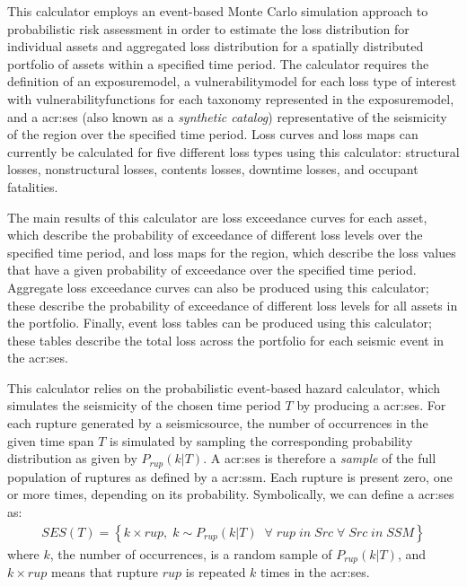 This calculator employs an event-based Monte Carlo simulation approach to
probabilistic risk assessment in order to estimate the loss distribution for
individual \glspl{asset} and aggregated loss distribution for a spatially
distributed portfolio of \glspl{asset} within a specified time period. The
calculator requires the definition of an \gls{exposuremodel}, a
\gls{vulnerabilitymodel} for each loss type of interest with
\glspl{vulnerabilityfunction} for each taxonomy represented in the
\gls{exposuremodel}, and a \glsdesc{acr:ses} (also known as a
\textit{synthetic catalog}) representative of the seismicity of the region
over the specified time period. Loss curves and loss maps can currently be
calculated for five different loss types using this calculator: structural
losses, nonstructural losses, contents losses, downtime losses, and occupant
fatalities.

The main results of this calculator are loss
exceedance curves for each \gls{asset}, which describe the probability of
exceedance of different loss levels over the specified time period, and loss
maps for the region, which describe the loss values that have a given
probability of exceedance over the specified time period. Aggregate loss
exceedance curves can also be produced using this calculator; these
describe the probability of exceedance of different loss levels for all
\glspl{asset} in the portfolio. Finally, event loss tables can be produced
using this calculator; these tables describe the total loss across the
portfolio for each seismic event in the \gls{acr:ses}.

This calculator relies on the probabilistic event-based hazard calculator,
which simulates the seismicity of the chosen time period $T$ by producing a
\gls{acr:ses}. For each \gls{rupture} generated by a \gls{seismicsource}, the
number of occurrences in the given time span $T$ is simulated by sampling the
corresponding probability distribution as given by $P_{rup}(k | T)$. A
\gls{acr:ses} is therefore a \textit{sample} of the full population of
\glspl{rupture} as defined by a \glsdesc{acr:ssm}. Each \gls{rupture} is
present zero, one or more times, depending on its probability. Symbolically,
we can define a \gls{acr:ses} as:
\begin{align}
SES(T) = \left\{k \times rup,\;k\sim P_{rup}(k | T)\;\;\forall\;rup\;in\;Src\;\forall\;Src\;in\;SSM\right\}
\end{align}
where $k$, the number of occurrences, is a random sample of $P_{rup}(k | T)$,
and $k \times rup$ means that \gls{rupture} $rup$ is repeated $k$ times in the
\gls{acr:ses}.

